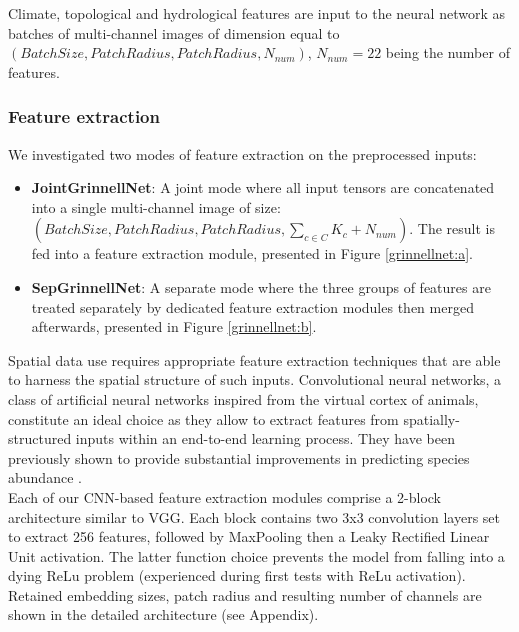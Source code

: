 \documentclass[]{article}
\begin{document}
\noindent Climate, topological and hydrological features are input to the neural network as batches of multi-channel images of dimension equal to $(BatchSize, PatchRadius, PatchRadius, N_{num})$, $N_{num}=22$ being the number of features.

\subsubsection{Feature extraction}
We investigated two modes of feature extraction on the preprocessed inputs:
\begin{itemize}
	\item \textbf{JointGrinnellNet}: A joint mode where all input tensors are concatenated into a single multi-channel image of size: $(BatchSize, PatchRadius, PatchRadius, \sum_{c \in C}{K_c} + N_{num})$. The result is fed into a feature extraction module, presented in Figure \ref{grinnellnet:a}.
	\item \textbf{SepGrinnellNet}: A separate mode where the three groups of features are treated separately by dedicated feature extraction modules then merged afterwards, presented in Figure \ref{grinnellnet:b}.
\end{itemize} 

\noindent Spatial data use requires appropriate feature extraction techniques that are able to harness the spatial structure of such inputs. Convolutional neural networks\cite{lecun1995convolutional}, a class of artificial neural networks inspired from the virtual cortex of animals, constitute an ideal choice as they allow to extract features from spatially-structured inputs within an end-to-end learning process. They have been previously shown to provide substantial improvements in predicting species abundance \cite{botella2018deep,deneu2018location}.\\

\noindent Each of our CNN-based feature extraction modules comprise a 2-block architecture similar to VGG\cite{simonyan2014very}. Each block contains two 3x3 convolution layers set to extract 256 features, followed by MaxPooling then a Leaky Rectified Linear Unit activation. The latter function choice prevents the model from falling into a dying ReLu problem (experienced during first tests with ReLu activation)\cite{maas2013rectifier}. Retained embedding sizes, patch radius and resulting number of channels are shown in the detailed architecture (see Appendix).
\end{document}

